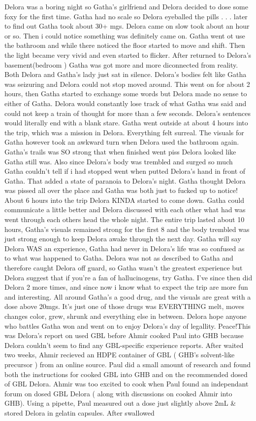 \documentclass[12pt]{book}
\begin{document}
Delora was a boring night so Gatha's girlfriend and Delora decided to dose some foxy for the first time. Gatha had no scale so Delora eyeballed the pills . . .  later to find out Gatha took about 30+ mgs. Delora came on slow took about an hour or so. Then i could notice something was definitely came on. Gatha went ot use the bathroom and while there noticed the floor started to move and shift. Then the light became very vivid and even started to flicker. After returned to Delora's basement(bedroom ) Gatha was got more and more diconnected from reality. Both Delora and Gatha's lady just sat in silence. Delora's bodies felt like Gatha was seizuring and Delora could not stop moved around. This went on for about 2 hours, then Gatha started to exchange some words but Delora made no sense to either of Gatha. Delora would constantly lose track of what Gatha was said and could not keep a train of thought for more than a few seconds. Delora's sentences would literally end with a blank stare. Gatha went outside at about 4 hours into the trip, which was a mission in Delora. Everything felt surreal. The visuals for Gatha however took an awkward turn when Delora used the bathroom again. Gatha's trails was SO strong that when finished went piss Delora looked like Gatha still was. Also since Delora's body was trembled and surged so much Gatha couldn't tell if i had stopped went when putted Delora's hand in front of Gatha. That added a state of paranoia to Delora's night. Gatha thought Delora was pissed all over the place and Gatha was both just to fucked up to notice! About 6 hours into the trip Delora KINDA started to come down. Gatha could communicate a little better and Delora discussed with each other what had was went through each others head the whole night. The entire trip lasted about 10 hours, Gatha's visuals remained strong for the first 8 and the body trembled was just strong enough to keep Delora awake through the next day. Gatha will say Delora WAS an experience, Gatha had never in Delora's life was so confused as to what was happened to Gatha. Delora was not as described to Gatha and therefore caught Delora off guard, so Gatha wasn't the greatest experience but Delora suggest that if you're a fan of hallucinogens, try Gatha. I've since then did Delora 2 more times, and since now i know what to expect the trip are more fun and interesting. All around Gatha's a good drug, and the visuals are great with a dose above 20mgs. It's just one of those drugs was EVERYTHING melt, moves changes color, grew, shrunk and everything else in between. Delora hope anyone who battles Gatha won and went on to enjoy Delora's day of legallity. Peace!This was Delora's report on used GBL before Ahmir cooked Paul into GHB because Delora couldn't seem to find any GBL-specific experience reports. After waited two weeks, Ahmir recieved an HDPE container of GBL ( GHB's solvent-like precursor ) from an online source. Paul did a small amount of research and found both the instructions for cooked GBL into GHB and on the recommended dosed of GBL Delora. Ahmir was too excited to cook when Paul found an independant forum on dosed GBL Delora ( along with discussions on cooked Ahmir into GHB). Using a pipette, Paul measured out a dose just slightly above 2mL \& stored Delora in gelatin capsules. After swallowed 
\end{document}
